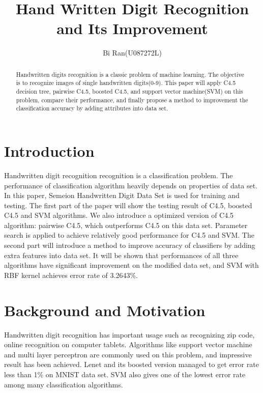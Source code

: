 \documentclass[a4paper,11pt]{article}
\author{Bi Ran(U087272L)}
\title{Hand Written Digit Recognition and Its Improvement}
\begin{document}
\maketitle
\begin{abstract}
Handwritten digits recognition is a classic problem of machine learning. The objective is to recognize images of single handwritten digits(0-9). This paper will apply C4.5 decision tree, pairwise C4.5, boosted C4.5, and support vector machine(SVM) on this problem, compare their performance, and finally propose a method to improvement the classification accuracy by adding attributes into data set.
\end{abstract}
\section{Introduction}
Handwritten digit recognition recognition is a classification problem. The performance of classification algorithm heavily depends on properties of data set.
In this paper, Semeion Handwritten Digit Data Set is used for training and testing. The first part of the paper will show the testing result of C4.5, boosted C4.5 and SVM algorithms. We also introduce a optimized version of C4.5 algorithm: pairwise C4.5, which outperforms C4.5 on this data set. Parameter search is applied to achieve relatively good performance for C4.5 and SVM.
The second part will introduce a method to improve accuracy of classifiers by adding extra features into data set. It will be shown that performances of all three algorithms have significant improvement on the modified data set, and SVM with RBF kernel achieves error rate of 3.2643\%.
\section{Background and Motivation}
Handwritten digit recognition has important usage such as recognizing zip code, online recognition on computer tablets. Algorithms like support vector machine and multi layer perceptron are commonly used on this problem, and impressive result has been achieved. Lenet and its boosted version managed to get error rate less than 1\% on MNIST data set\cite{Kussul_improvedmethod}. SVM also gives one of the lowest error rate among many classification algorithms.
\end{document}
